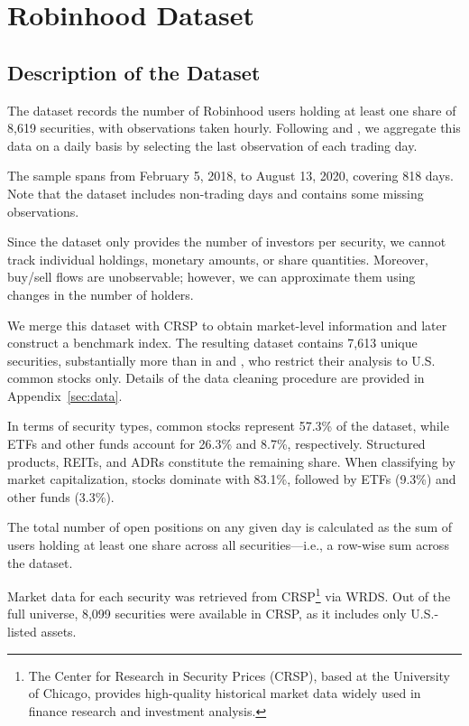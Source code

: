 \section{Robinhood Dataset}
\subsection{Description of the Dataset}
The dataset records the number of Robinhood users holding at least one share of 8,619 securities, with observations taken hourly. 
Following \cite{Welch2022} and \cite{Fedyk2024}, we aggregate this data on a daily basis by selecting the last observation of each trading day.

The sample spans from February 5, 2018, to August 13, 2020, covering 818 days. Note that the dataset includes non-trading days and contains some missing observations.

Since the dataset only provides the number of investors per security, we cannot track individual holdings, monetary amounts, or share quantities. 
Moreover, buy/sell flows are unobservable; however, we can approximate them using changes in the number of holders.

We merge this dataset with CRSP to obtain market-level information and later construct a benchmark index. 
The resulting dataset contains 7,613 unique securities, substantially more than in \cite{Fedyk2024} and \cite{Welch2022}, who restrict their analysis to U.S. common stocks only. 
Details of the data cleaning procedure are provided in Appendix~\ref{sec:data}.

In terms of security types, common stocks represent 57.3\% of the dataset, while ETFs and other funds account for 26.3\% and 8.7\%, respectively. 
Structured products, REITs, and ADRs constitute the remaining share. 
When classifying by market capitalization, stocks dominate with 83.1\%, followed by ETFs (9.3\%) and other funds (3.3\%).

The total number of open positions on any given day is calculated as the sum of users holding at least one share across all securities—i.e., a row-wise sum across the dataset.

Market data for each security was retrieved from CRSP\footnote{The Center for Research in Security Prices (CRSP), based at the University of Chicago, provides high-quality historical market data widely used in finance research and investment analysis.} via WRDS. 
Out of the full universe, 8,099 securities were available in CRSP, as it includes only U.S.-listed assets. 


